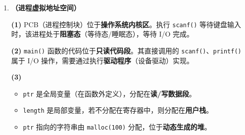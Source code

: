 \documentclass[12pt,a4paper]{ctexart}
\begin{document}
\begin{enumerate}[leftmargin=*,resume]
\[
\text{缺失率} = \frac{128}{4096} \times 100\% = 3.125\% \approx 3.13\%
\]

\[
\text{平均访问时间} = 2 + 3.125\% \times 200 = 2 + 6.25 = 8.25 \ \text{时钟周期}
\]

\textbf{(4) 页面分布与缺页次数：}

\texttt{d} 起始于 0180\,0020H，终止于：
\[
\mathrm{0180\,0020H} + 2047 \times 4 = \mathrm{0180\,0020H} + \mathrm{1FFCH} = \mathrm{0180\,201CH}
\]

页号（VA[31:12]）：
\begin{itemize}
\item 起始页号：01800H
\item 终止页号：01802H
\end{itemize}

故 \texttt{d} 分布在 3 个页面中（页 01800H、01801H、01802H）。

按顺序访问，每进入一个新页面触发一次缺页（共 3 次）：
\begin{itemize}
\item \texttt{d[0]}（01800H 页）：第 1 次缺页
\item \texttt{d[1016]}（01801H 页）：第 2 次缺页
\item \texttt{d[2040]}（01802H 页）：第 3 次缺页
\end{itemize}

缺页次数 $= 3$。

\newpage

\item \textbf{（进程虚拟地址空间）}

\textbf{(1)} PCB（进程控制块）位于\textbf{操作系统内核区}。执行 \texttt{scanf()} 等待键盘输入时，该进程处于\textbf{阻塞态}（等待态/睡眠态），等待 I/O 完成。

\textbf{(2)} \texttt{main()} 函数的代码位于\textbf{只读代码段}。其直接调用的 \texttt{scanf()}、\texttt{printf()} 属于 I/O 操作，需要通过执行\textbf{驱动程序}（设备驱动）实现。

\textbf{(3)}
\begin{itemize}
\item \texttt{ptr} 是全局变量（在函数外定义），分配在\textbf{读/写数据段}。
\item \texttt{length} 是局部变量，若不分配在寄存器中，则分配在\textbf{用户栈}。
\item \texttt{ptr} 指向的字符串由 \texttt{malloc(100)} 分配，位于\textbf{动态生成的堆}。
\end{itemize}

\newpage


\end{enumerate}
\end{document}
